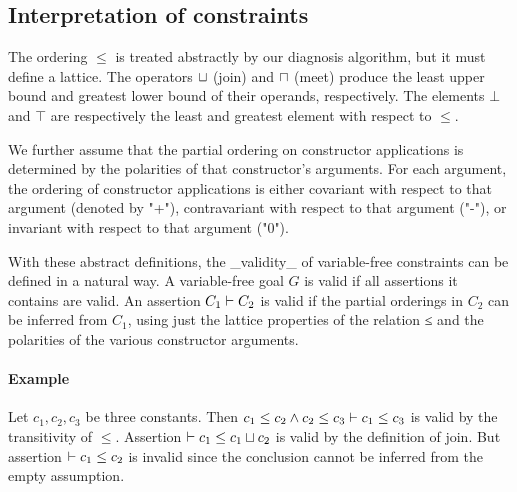 
\subsection{Interpretation of constraints}

The ordering $\leq$ is treated abstractly by our diagnosis algorithm,
but it must define a lattice. The operators $\sqcup$ (join) and $\sqcap$
(meet) produce the least upper bound and greatest lower bound
of their operands, respectively.
%
The elements $\bot$ and $\top$ are respectively the least and greatest
element with respect to $\leq$.

We further assume that the partial ordering on constructor applications
is determined by the polarities of that constructor's arguments.
For each argument, the ordering of constructor applications is either
covariant with respect to that argument (denoted by "+"),
contravariant with respect
to that argument ("-"), or invariant with respect to that argument
("0").

With these abstract definitions, the _validity_ of variable-free constraints can be defined
in a natural way. A variable-free goal $G$ is valid if all assertions it contains are valid.
An assertion $C_1 \vdash C_2$ is valid if
the partial orderings in $C_2$ can be inferred from $C_1$, using just
the lattice properties of the relation ≤ and the polarities of the
various constructor arguments.

\paragraph{Example}

Let $c_1, c_2, c_3$ be three constants. Then $c_1 \leq c_2 \land c_2 \leq c_3
\vdash c_1 \leq c_3$ is valid by the transitivity of $\leq$. Assertion
$\vdash c_1 \leq c_1 \sqcup c_2$ is valid by the definition of join. But
assertion $\vdash c_1\leq c_2$ is invalid since the
conclusion cannot be inferred from the empty assumption.

